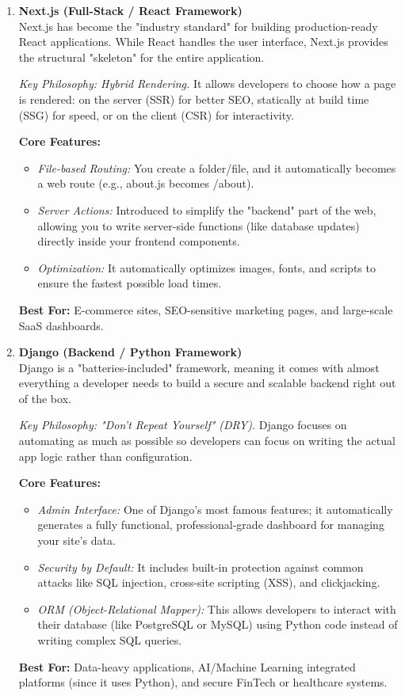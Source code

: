 \documentclass[a4paper,12pt]{article}
\begin{document}
\begin{enumerate}
    \item \textbf{Next.js (Full-Stack / React Framework)} \\
    Next.js has become the "industry standard" for building production-ready React applications. While React handles the user interface, Next.js provides the structural "skeleton" for the entire application.
    
    \textit{Key Philosophy: Hybrid Rendering.} It allows developers to choose how a page is rendered: on the server (SSR) for better SEO, statically at build time (SSG) for speed, or on the client (CSR) for interactivity.
    
    \textbf{Core Features:}
    \begin{itemize}
        \item \textit{File-based Routing:} You create a folder/file, and it automatically becomes a web route (e.g., about.js becomes /about).
        \item \textit{Server Actions:} Introduced to simplify the "backend" part of the web, allowing you to write server-side functions (like database updates) directly inside your frontend components.
        \item \textit{Optimization:} It automatically optimizes images, fonts, and scripts to ensure the fastest possible load times.
    \end{itemize}
    \textbf{Best For:} E-commerce sites, SEO-sensitive marketing pages, and large-scale SaaS dashboards.

    \item \textbf{Django (Backend / Python Framework)} \\
    Django is a "batteries-included" framework, meaning it comes with almost everything a developer needs to build a secure and scalable backend right out of the box.
    
    \textit{Key Philosophy: "Don't Repeat Yourself" (DRY).} Django focuses on automating as much as possible so developers can focus on writing the actual app logic rather than configuration.
    
    \textbf{Core Features:}
    \begin{itemize}
        \item \textit{Admin Interface:} One of Django's most famous features; it automatically generates a fully functional, professional-grade dashboard for managing your site's data.
        \item \textit{Security by Default:} It includes built-in protection against common attacks like SQL injection, cross-site scripting (XSS), and clickjacking.
        \item \textit{ORM (Object-Relational Mapper):} This allows developers to interact with their database (like PostgreSQL or MySQL) using Python code instead of writing complex SQL queries.
    \end{itemize}
    \textbf{Best For:} Data-heavy applications, AI/Machine Learning integrated platforms (since it uses Python), and secure FinTech or healthcare systems.
\end{enumerate}
\end{document}
